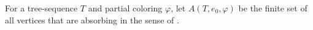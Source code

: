\begin{definition}
For a tree-sequence $T$ and partial coloring $\varphi$, let
$A(T,e_0,\varphi)$ be the finite set of all vertices that are absorbing in
the sense of .
\end{definition}
